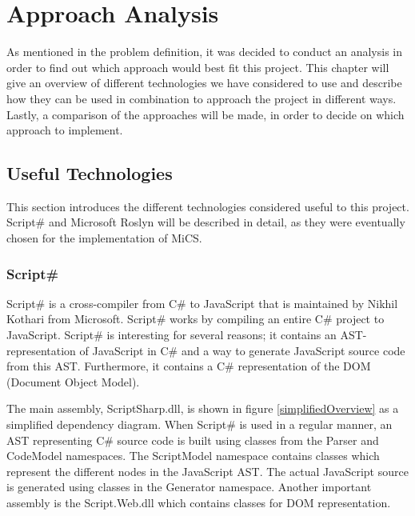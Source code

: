\chapter{Approach Analysis}
	As mentioned in the problem definition, it was decided to conduct an analysis in order to find out which approach would best fit this project. This chapter will give an overview of different technologies we have considered to use and describe how they can be used in combination to approach the project in different ways. Lastly, a comparison of the approaches will be made, in order to decide on which approach to implement.

\section{Useful Technologies}
	This section introduces the different technologies considered useful to this project. Script\# and Microsoft Roslyn will be described in detail, as they were eventually chosen for the implementation of MiCS.

	

	\subsection{Script\#} %
	\label{sub:subsection_scriptsharp}
		Script\# \cite{scriptsharp} is a cross-compiler from C\# to JavaScript that is maintained by Nikhil Kothari \cite{nikhilk} from Microsoft. Script\# works by compiling an entire C\# project to JavaScript. Script\# is interesting for several reasons; it contains an AST-representation of JavaScript in C\# and a way to generate JavaScript source code from this AST. Furthermore, it contains a C\# representation of the DOM (Document Object Model).

		The main assembly, ScriptSharp.dll, is shown in figure \ref{simplifiedOverview} as a simplified dependency diagram. When Script\# is used in a regular manner, an AST representing C\# source code is built using classes from the Parser and CodeModel namespaces. The ScriptModel namespace contains classes which represent the different nodes in the JavaScript AST. The actual JavaScript source is generated using classes in the Generator namespace. Another important assembly is the Script.Web.dll which contains classes for DOM representation.

